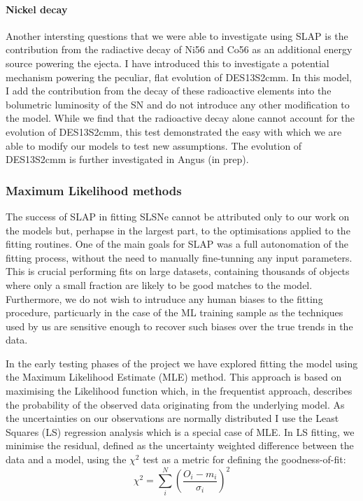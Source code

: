 \paragraph{Nickel decay}
Another intersting questions that we were able to investigate using \textsc{SLAP} is the contribution from the radiactive decay of Ni56 and Co56 as an additional energy source powering the ejecta. I have introduced this to investigate a potential mechanism powering the peculiar, flat evolution of DES13S2cmm. In this model, I add the contribution from the decay of these radioactive elements into the bolumetric luminosity of the SN and do not introduce any other modification to the model. While we find that the radioactive decay alone cannot account for the evolution of DES13S2cmm, this test demonstrated the easy with which we are able to modify our models to test new assumptions. The evolution of DES13S2cmm is further investigated in Angus (in prep).

\subsubsection{Maximum Likelihood methods}
The success of \textsc{SLAP} in fitting SLSNe cannot be attributed only to our work on the models but, perhapse in the largest part, to the optimisations applied to the fitting routines. One of the main goals for \textsc{SLAP} was a full autonomation of the fitting process, without the need to manually fine-tunning any input parameters. This is crucial performing fits on large datasets, containing thousands of objects where only a small fraction are likely to be good matches to the model. Furthermore, we do not wish to intruduce any human biases to the fitting procedure, particuarly in the case of the ML training sample as the techniques used by us are sensitive enough to recover such biases over the true trends in the data.

In the early testing phases of the project we have explored fitting the model using the Maximum Likelihood Estimate (MLE) method. This approach is based on maximising the Likelihood function which, in the frequentist approach, describes the probability of the observed data originating from the underlying model. As the uncertainties on our observations are normally distributed I use the Least Squares (LS) regression analysis which is a special case of MLE. In LS fitting, we minimise the residual, defined as the uncertainty weighted difference between the data and a model, using the $\chi^{2}$ test as a metric for defining the goodness-of-fit:
\begin{equation}
  \chi^2 = \sum\limits_i^N \left( \frac{O_i - m_i}{\sigma_i} \right)^2
\end{equation}


